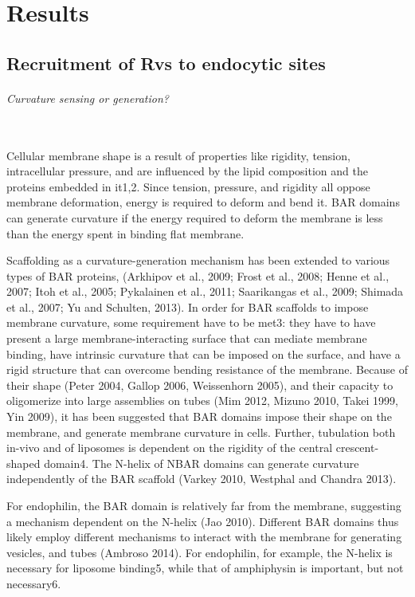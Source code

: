 \chapter{Results}    \label{results}
\section{Recruitment of Rvs to endocytic sites}

	\subparagraph{Curvature sensing or generation? }
	\mbox{}\\
Cellular membrane shape is a result of properties like rigidity, tension, intracellular pressure, and are influenced by the lipid composition and the proteins embedded in it1,2. Since tension, pressure, and rigidity all oppose membrane deformation, energy is required to deform and bend it. BAR domains can generate curvature if the energy required to deform the membrane is less than the energy spent in binding flat membrane.

\vspace{5mm}
			
Scaffolding as a curvature-generation mechanism has been extended to various types of BAR proteins, (Arkhipov et al., 2009; Frost et al., 2008; Henne et al., 2007; Itoh et al., 2005; Pykalainen et al., 2011; Saarikangas et al., 2009; Shimada et al., 2007; Yu and Schulten, 2013). In order for BAR scaffolds to impose membrane curvature, some requirement have to be met3: they have to have present a large membrane-interacting surface that can mediate membrane binding, have intrinsic curvature that can be imposed on the surface, and have a rigid structure that can overcome bending resistance of the membrane. Because of their shape (Peter 2004, Gallop 2006, Weissenhorn 2005), and their capacity to oligomerize into large assemblies on tubes (Mim 2012, Mizuno 2010, Takei 1999, Yin 2009), it has been suggested that BAR domains impose their shape on the membrane, and generate membrane curvature in cells. Further, tubulation both in-vivo and of liposomes is dependent on the rigidity of the central crescent-shaped domain4. The N-helix of NBAR domains can generate curvature independently of the BAR scaffold (Varkey 2010, Westphal and Chandra 2013).

\vspace{5mm}
For endophilin, the BAR domain is relatively far from the membrane, suggesting a mechanism dependent on the N-helix (Jao 2010). Different BAR domains thus likely employ different mechanisms to interact with the membrane for generating vesicles, and tubes (Ambroso 2014). For endophilin, for example, the N-helix is necessary for liposome binding5, while that of amphiphysin is important, but not necessary6. 

